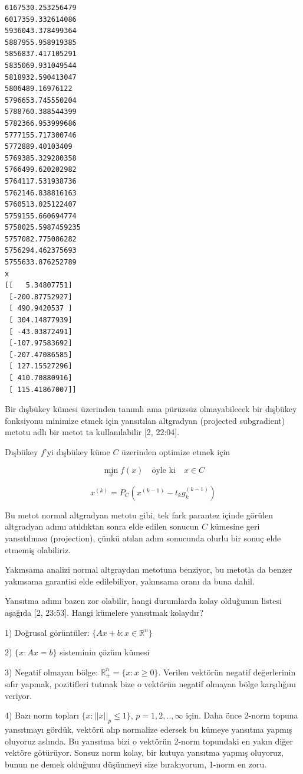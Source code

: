 \documentclass[12pt,fleqn]{article}\usepackage{../../common}
\begin{document}
\begin{verbatim}
6167530.253256479
6017359.332614086
5936043.378499364
5887955.958919385
5856837.417105291
5835069.931049544
5818932.590413047
5806489.16976122
5796653.745550204
5788760.388544399
5782366.953999686
5777155.717300746
5772889.40103409
5769385.329280358
5766499.620202982
5764117.531938736
5762146.838816163
5760513.025122407
5759155.660694774
5758025.5987459235
5757082.775086282
5756294.462375693
5755633.876252789
x
[[   5.34807751]
 [-200.87752927]
 [ 490.9420537 ]
 [ 304.14877939]
 [ -43.03872491]
 [-107.97583692]
 [-207.47086585]
 [ 127.15527296]
 [ 410.70880916]
 [ 115.41867007]]
\end{verbatim}

Bir dışbükey kümesi üzerinden tanımlı ama pürüzsüz olmayabilecek bir
dışbükey fonksiyonu minimize etmek için yansıtılan altgradyan (projected
subgradient) metotu adlı bir metot ta kullanılabilir [2, 22:04].  

Dışbükey $f$'yi dışbükey küme $C$ üzerinden optimize etmek için 

$$
\min_x f(x) \quad \textrm{öyle ki} \quad x \in C
$$

$$
x^{(k)} = P_C \left( x^{(k-1)} - t_k g_k^{(k-1)} \right)
$$

Bu metot normal altgradyan metotu gibi, tek fark parantez içinde görülen
altgradyan adımı atıldıktan sonra elde edilen sonucun $C$ kümesine geri
yansıtılması (projection), çünkü atılan adım sonucunda olurlu bir sonuç
elde etmemiş olabiliriz. 

Yakınsama analizi normal altgraydan metotuna benziyor, bu metotla da benzer
yakınsama garantisi elde edilebiliyor, yakınsama oranı da buna dahil.

Yansıtma adımı bazen zor olabilir, hangi durumlarda kolay olduğunun listesi
aşağıda [2, 23:53]. Hangi kümelere yansıtmak kolaydır?

1) Doğrusal görüntüler: $\{  Ax + b: x \in \mathbb{R}^n  \}$

2) $\{ x: Ax = b \}$ sisteminin çözüm kümesi 

3) Negatif olmayan bölge: $\mathbb{R}_{+}^n = \{x: x \ge 0 \}$. Verilen
vektörün negatif değerlerinin sıfır yapmak, pozitifleri tutmak bize o
vektörün negatif olmayan bölge karşılığını veriyor. 

4) Bazı norm topları $\{ x: ||x||_p \le 1 \}$, $p=1,2,..,\infty$ için. Daha
önce 2-norm topuna yansıtmayı gördük, vektörü alıp normalize edersek bu
kümeye yansıtma yapmış oluyoruz aslında. Bu yansıtma bizi o vektörün 2-norm
topundaki en yakın diğer vektöre götürüyor. Sonsuz norm kolay, bir kutuya
yansıtma yapmış oluyoruz, bunun ne demek olduğunu düşünmeyi size
bırakıyorum, 1-norm en zoru. 
\end{document}
